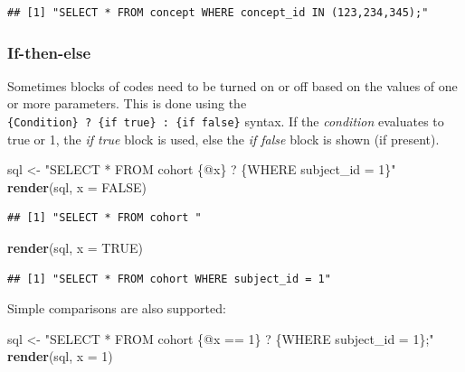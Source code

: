 \documentclass[11pt]{book}
\newenvironment{Shaded}{\begin{snugshade}}{\end{snugshade}}
\newcommand{\DataTypeTok}[1]{\textcolor[rgb]{0.13,0.29,0.53}{#1}}
\newcommand{\DecValTok}[1]{\textcolor[rgb]{0.00,0.00,0.81}{#1}}
\newcommand{\KeywordTok}[1]{\textcolor[rgb]{0.13,0.29,0.53}{\textbf{#1}}}
\newcommand{\NormalTok}[1]{#1}
\newcommand{\OtherTok}[1]{\textcolor[rgb]{0.56,0.35,0.01}{#1}}
\newcommand{\StringTok}[1]{\textcolor[rgb]{0.31,0.60,0.02}{#1}}
\theoremstyle{definition}
\theoremstyle{definition}
\theoremstyle{definition}
\theoremstyle{remark}
\begin{document}
\begin{verbatim}
## [1] "SELECT * FROM concept WHERE concept_id IN (123,234,345);"
\end{verbatim}

\hypertarget{if-then-else}{%
\subsubsection*{If-then-else}\label{if-then-else}}

Sometimes blocks of codes need to be turned on or off based on the values of one or more parameters. This is done using the \texttt{\{Condition\}\ ?\ \{if\ true\}\ :\ \{if\ false\}} syntax. If the \emph{condition} evaluates to true or 1, the \emph{if true} block is used, else the \emph{if false} block is shown (if present).

\begin{Shaded}
\begin{Highlighting}[]
\NormalTok{sql <-}\StringTok{ "SELECT * FROM cohort \{@x\} ? \{WHERE subject_id = 1\}"}
\KeywordTok{render}\NormalTok{(sql, }\DataTypeTok{x =} \OtherTok{FALSE}\NormalTok{)}
\end{Highlighting}
\end{Shaded}

\begin{verbatim}
## [1] "SELECT * FROM cohort "
\end{verbatim}

\begin{Shaded}
\begin{Highlighting}[]
\KeywordTok{render}\NormalTok{(sql, }\DataTypeTok{x =} \OtherTok{TRUE}\NormalTok{)}
\end{Highlighting}
\end{Shaded}

\begin{verbatim}
## [1] "SELECT * FROM cohort WHERE subject_id = 1"
\end{verbatim}

Simple comparisons are also supported:

\begin{Shaded}
\begin{Highlighting}[]
\NormalTok{sql <-}\StringTok{ "SELECT * FROM cohort \{@x == 1\} ? \{WHERE subject_id = 1\};"}
\KeywordTok{render}\NormalTok{(sql, }\DataTypeTok{x =} \DecValTok{1}\NormalTok{)}
\end{Highlighting}
\end{Shaded}
\end{document}

